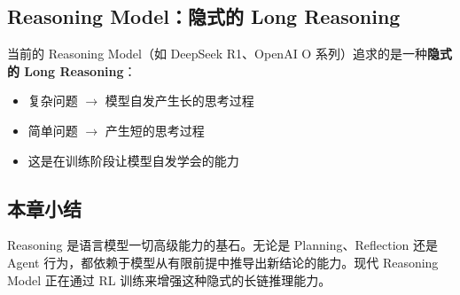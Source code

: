 \subsection{Reasoning Model：隐式的 Long Reasoning}

当前的 Reasoning Model（如 DeepSeek R1、OpenAI O 系列）追求的是一种\textbf{隐式的 Long Reasoning}：
\begin{itemize}
    \item 复杂问题 $\rightarrow$ 模型自发产生长的思考过程
    \item 简单问题 $\rightarrow$ 产生短的思考过程
    \item 这是在训练阶段让模型自发学会的能力
\end{itemize}

\subsection{本章小结}

Reasoning 是语言模型一切高级能力的基石。无论是 Planning、Reflection 还是 Agent 行为，都依赖于模型从有限前提中推导出新结论的能力。现代 Reasoning Model 正在通过 RL 训练来增强这种隐式的长链推理能力。


